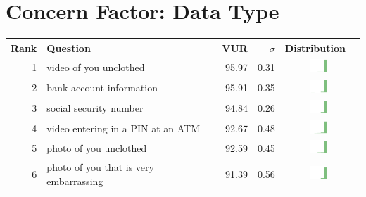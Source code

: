 
\onecolumn
\section{Concern Factor: Data Type}
\label{sec:data-appendix} 

\begin{table}[t]
\begin{center}
\small
\begin{tabular}{| r | l | r | r | r | r |}
\hline
Rank & Question & VUR & $\sigma$ & Distribution \\
\hline
1 & video of you unclothed & 95.97 & 0.31 &  \includegraphics[width = 2cm, height = 0.5cm]{tex-inputs/table-images/tookavideoofyouunclothedcombined} \\ 
2 & bank account information & 95.91 & 0.35 & \includegraphics[width = 2cm, height = 0.5cm]{tex-inputs/table-images/learnedyourbankaccountinformationcombined} \\ 
3 & social security number & 94.84 & 0.26 & \includegraphics[width = 2cm, height = 0.5cm]{tex-inputs/table-images/learnedyoursocialsecuritynumbercombined} \\ 
4 & video entering in a PIN at an ATM & 92.67 & 0.48 &  \includegraphics[width = 2cm, height = 0.5cm]{tex-inputs/table-images/tookavideoofyouenteringinyourPINatanATMcombined} \\ 
5 & photo of you unclothed & 92.59 & 0.45 &  \includegraphics[width = 2cm, height = 0.5cm]{tex-inputs/table-images/tookaphotoofyouunclothedcombined} \\ 
6 & photo of you that is very embarrassing & 91.39 & 0.56 &  \includegraphics[width = 2cm, height = 0.5cm]{tex-inputs/table-images/tookanincriminatingphotoofyoudoingsomethingembarrassingcombined} \\ 

\end{tabular}
\end{center}
\end{table}
